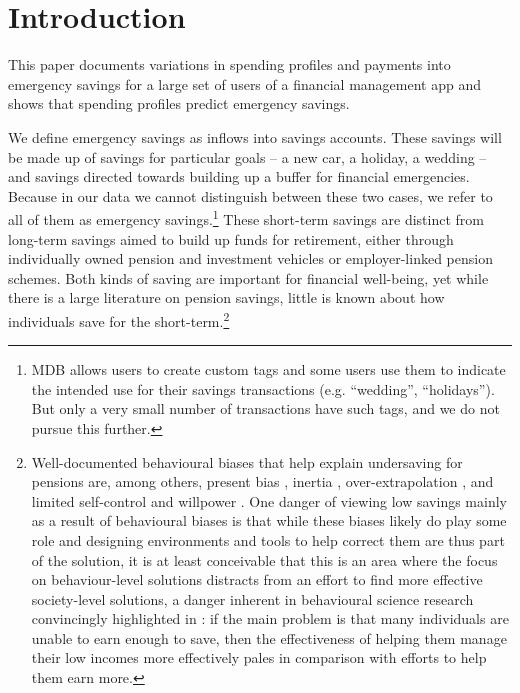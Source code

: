 
\section{Introduction}%
\label{sec:introduction}

This paper documents variations in spending profiles and payments into
emergency savings for a large set of users of a financial management app
and shows that spending profiles predict emergency savings.

We define emergency savings as inflows into savings accounts. These savings
will be made up of savings for particular goals -- a new car, a holiday, a
wedding -- and savings directed towards building up a buffer for financial
emergencies. Because in our data we cannot distinguish between these two cases,
we refer to all of them as emergency savings.\footnote{MDB allows users to
    create custom tags and some users use them to indicate the intended use for
    their savings transactions (e.g. ``wedding'', ``holidays''). But only a very
small number of transactions have such tags, and we do not pursue this
further.} These short-term savings are distinct from long-term savings aimed to
build up funds for retirement, either through individually owned pension and
investment vehicles or employer-linked pension schemes. Both kinds of saving
are important for financial well-being, yet while there is a large literature
on pension savings, little is known about how individuals save for the
short-term.\footnote{Well-documented behavioural biases that help explain
    undersaving for pensions are, among others, present bias
    \citep{laibson1997golden, laibson2019intertemporal}, inertia
    \citep{madrian2001power}, over-extrapolation \citep{choi2009reinforcement},
    and limited self-control and willpower \citep{thaler1981economic,
    benhabib2005modeling, fudenberg2006dual, loewenstein2004animal,
gul2001temptation}. One danger of viewing low savings mainly as a result of
behavioural biases is that while these biases likely do play some role and
designing environments and tools to help correct them are thus part of the
solution, it is at least conceivable that this is an area where the focus on
behaviour-level solutions distracts from an effort to find more effective
society-level solutions, a danger inherent in behavioural science research
convincingly highlighted in \citet{chater2022frame}: if the main problem is
that many individuals are unable to earn enough to save, then the effectiveness of
helping them manage their low incomes more effectively pales in comparison with
efforts to help them earn more.}

